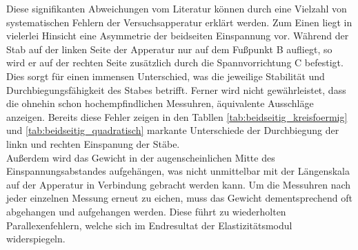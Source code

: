 Diese signifikanten Abweichungen vom Literatur können durch eine Vielzahl von systematischen Fehlern der Versuchsapperatur erklärt werden.
Zum Einen liegt in vielerlei Hinsicht eine Asymmetrie der beidseiten Einspannung vor. Während der Stab auf der linken Seite der Apperatur nur auf dem
Fußpunkt B aufliegt, so wird er auf der rechten Seite zusätzlich durch die Spannvorrichtung C befestigt. Dies sorgt für einen immensen Unterschied,
was die jeweilige Stabilität und Durchbiegungsfähigkeit des Stabes betrifft. Ferner wird nicht gewährleistet, dass die ohnehin schon hochempfindlichen 
Messuhren, äquivalente Ausschläge anzeigen. Bereits diese Fehler zeigen in den Tabllen \ref{tab:beidseitig_kreisfoermig} und \ref{tab:beidseitig_quadratisch}
markante Unterschiede der Durchbiegung der linkn und rechten Einspanung der Stäbe.\\
Außerdem wird das Gewicht in der augenscheinlichen Mitte des Einspannungsabstandes aufgehängen, was nicht unmittelbar mit der Längenskala auf der Apperatur
in Verbindung gebracht werden kann. Um die Messuhren nach jeder einzelnen Messung erneut zu eichen, muss das Gewicht dementsprechend oft abgehangen und aufgehangen 
werden. Diese führt zu wiederholten Parallexenfehlern, welche sich im Endresultat der Elastizitätsmodul widerspiegeln. 

